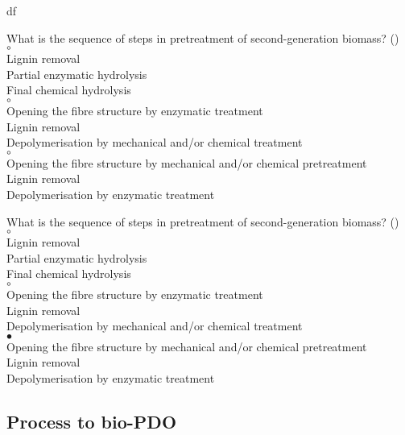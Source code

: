 df\documentclass[]{beamer}
\begin{document}
\begin{CJK}{UTF8}{gbsn}
\begin{frame}[shrink] {}
\addtocounter{questions}{1}
\color{blue}
What is the sequence of steps in pretreatment of second-generation biomass?
({})\\
\color{black}
\setlength{\parindent}{-0.4cm}
{\color{red}$\circ$}    \\
Lignin removal\\
Partial enzymatic hydrolysis\\
Final chemical hydrolysis\\
{\color{red}$\circ$}    \\
Opening the fibre structure by enzymatic treatment \\
Lignin removal\\
Depolymerisation by mechanical and/or chemical treatment\\
{\color{red}$\circ$}    \\
Opening the fibre structure by mechanical and/or chemical pretreatment\\
Lignin removal\\
Depolymerisation by enzymatic treatment\\
\end{frame}
\begin{frame}[shrink] {}
\addtocounter{answers}{1}
\color{blue}
What is the sequence of steps in pretreatment of second-generation biomass?
({})\\
\color{black}
\setlength{\parindent}{-0.4cm}
{\color{red}$\circ$}    \\
Lignin removal\\
Partial enzymatic hydrolysis\\
Final chemical hydrolysis\\
{\color{red}$\circ$}    \\
Opening the fibre structure by enzymatic treatment \\
Lignin removal\\
Depolymerisation by mechanical and/or chemical treatment\\
{\color{red}$\bullet$}   \\
Opening the fibre structure by mechanical and/or chemical pretreatment\\
Lignin removal\\
Depolymerisation by enzymatic treatment\\
\end{frame}

\subsection{Process to bio-PDO}
\setcounter{questions}{0}
\setcounter{answers}{0}



\end{CJK}
\end{document}
